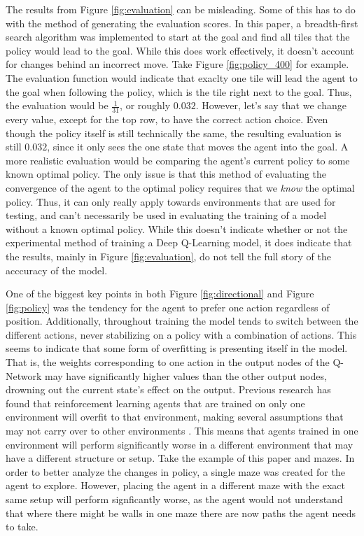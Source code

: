 \documentclass[12pt,letterpaper]{article}
\begin{document}
The results from Figure \ref{fig:evaluation} can be misleading.
Some of this has to do with the method of generating the evaluation scores.
In this paper, a breadth-first search algorithm was implemented to start at the goal and find all tiles that the policy would lead to the goal.
While this does work effectively, it doesn't account for changes behind an incorrect move.
Take Figure \ref{fig:policy_400} for example.
The evaluation function would indicate that exaclty one tile will lead the agent to the goal when following the policy, which is the tile right next to the goal.
Thus, the evaluation would be $\frac{1}{31}$, or roughly $0.032$.
However, let's say that we change every value, except for the top row, to have the correct action choice.
Even though the policy itself is still technically the same, the resulting evaluation is still $0.032$, since it only sees the one state that moves the agent into the goal.
A more realistic evaluation would be comparing the agent's current policy to some known optimal policy.
The only issue is that this method of evaluating the convergence of the agent to the optimal policy requires that we \textit{know} the optimal policy.
Thus, it can only really apply towards environments that are used for testing, and can't necessarily be used in evaluating the training of a model without a known optimal policy.
While this doesn't indicate whether or not the experimental method of training a Deep Q-Learning model, it does indicate that the results, mainly in Figure \ref{fig:evaluation}, do not tell the full story of the acccuracy of the model.

One of the biggest key points in both Figure \ref{fig:directional} and Figure \ref{fig:policy} was the tendency for the agent to prefer one action regardless of position.
Additionally, throughout training the model tends to switch between the different actions, never stabilizing on a policy with a combination of actions.
This seems to indicate that some form of overfitting is presenting itself in the model.
That is, the weights corresponding to one action in the output nodes of the Q-Network may have significantly higher values than the other output nodes, drowning out the current state's effect on the output.
Previous research has found that reinforcement learning agents that are trained on only one environment will overfit to that environment, making several assumptions that may not carry over to other environments \cite{article_overfitting_neural_networks}.
This means that agents trained in one environment will perform significantly worse in a different environment that may have a different structure or setup.
Take the example of this paper and mazes. In order to better analyze the changes in policy, a single maze was created for the agent to explore.
However, placing the agent in a different maze with the exact same setup will perform signficantly worse, as the agent would not understand that where there might be walls in one maze there are now paths the agent needs to take.
\end{document}
